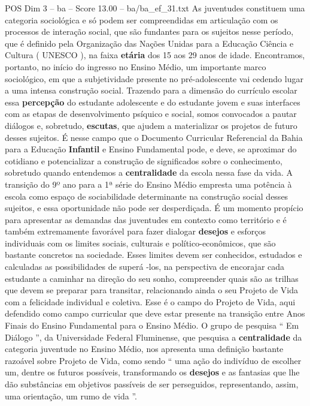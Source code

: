 \begin{textsample}{POS Dim 3 – ba – Score 13.00 – ba/ba\_ef\_31.txt}
As juventudes constituem uma categoria sociológica e só podem ser compreendidas em articulação com os processos de interação social, que são fundantes para os sujeitos nesse período, que é definido pela Organização das Nações Unidas para a Educação Ciência e Cultura ( UNESCO ), na faixa \textbf{etária} dos 15 aos 29 anos de idade.
Encontramos, portanto, no início do ingresso no Ensino Médio, um importante marco sociológico, em que a subjetividade presente no pré-adolescente vai cedendo lugar a uma intensa construção social.
Trazendo para a dimensão do currículo escolar essa \textbf{percepção} do estudante adolescente e do estudante jovem e suas interfaces com as etapas de desenvolvimento psíquico e social, somos convocados a pautar diálogos e, sobretudo, \textbf{escutas}, que ajudem a materializar os projetos de futuro desses sujeitos.
É nesse campo que o Documento Curricular Referencial da Bahia para a Educação \textbf{Infantil} e Ensino Fundamental pode, e deve, se aproximar do cotidiano e potencializar a construção de significados sobre o conhecimento, sobretudo quando entendemos a \textbf{centralidade} da escola nessa fase da vida.
A transição do 9º ano para a 1ª série do Ensino Médio empresta uma potência à escola como espaço de sociabilidade determinante na construção social desses sujeitos, e essa oportunidade não pode ser desperdiçada.
É um momento propício para apresentar as demandas das juventudes em contexto como território e é também extremamente favorável para fazer dialogar \textbf{desejos} e esforços individuais com os limites sociais, culturais e político-econômicos, que são bastante concretos na sociedade.
Esses limites devem ser conhecidos, estudados e calculadas as possibilidades de superá -los, na perspectiva de encorajar cada estudante a caminhar na direção do seu sonho, compreender quais são as trilhas que devem se preparar para transitar, relacionando ainda o seu Projeto de Vida com a felicidade individual e coletiva.
Esse é o campo do Projeto de Vida, aqui defendido como campo curricular que deve estar presente na transição entre Anos Finais do Ensino Fundamental para o Ensino Médio.
O grupo de pesquisa “ Em Diálogo ”, da Universidade Federal Fluminense, que pesquisa a \textbf{centralidade} da categoria juventude no Ensino Médio, nos apresenta uma definição bastante razoável sobre Projeto de Vida, como sendo “ uma ação do indivíduo de escolher um, dentre os futuros possíveis, transformando os \textbf{desejos} e as fantasias que lhe dão substâncias em objetivos passíveis de ser perseguidos, representando, assim, uma orientação, um rumo de vida ”.

\end{textsample}
